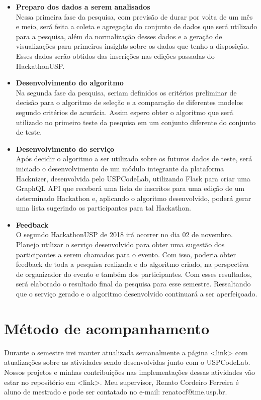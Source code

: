 \documentclass[10pt,twoside,a4paper]{article}
\begin{document}
  \begin{itemize}
    \item \textbf{Preparo dos dados a serem analisados} \\
        Nessa primeira fase da pesquisa, com previsão de durar por volta de um mês e meio, será feita a coleta e agregação do conjunto de dados que será utilizado para a pesquisa, além da normalização desses dados e a geração de visualizações para primeiros insights sobre os dados que tenho a disposição. Esses dados serão obtidos das inscrições nas edições passadas do HackathonUSP.
    
    \item \textbf{Desenvolvimento do algoritmo} \\
        Na segunda fase da pesquisa, seriam definidos os critérios preliminar de decisão para o algoritmo de seleção e a comparação de diferentes modelos segundo critérios de acurácia. Assim espero obter o algoritmo que será utilizado no primeiro teste da pesquisa em um conjunto diferente do conjunto de teste.
          
    \item \textbf{Desenvolvimento do serviço} \\
        Após decidir o algoritmo a ser utilizado sobre os futuros dados de teste, será iniciado o desenvolvimento de um módulo integrante da plataforma Hacknizer, desenvolvida pelo USPCodeLab, utilizando Flask para criar uma GraphQL API que receberá uma lista de inscritos para uma edição de um determinado Hackathon e, aplicando o algoritmo desenvolvido, poderá gerar uma lista sugerindo os participantes para tal Hackathon. 
    
    \item \textbf{Feedback} \\
        O segundo HackathonUSP de 2018 irá ocorrer no dia 02 de novembro. Planejo utilizar o serviço desenvolvido para obter uma sugestão dos participantes a serem chamados para o evento. Com isso, poderia obter feedback de toda a pesquisa realizada e do algoritmo criado, na perspectiva de organizador do evento e também dos participantes. Com esses resultados, será elaborado o resultado final da pesquisa para esse semestre. Ressaltando que o serviço gerado e o algoritmo desenvolvido continuará a ser aperfeiçoado.

  \end{itemize}

\section{Método de acompanhamento}

    Durante o semestre irei manter atualizada semanalmente a página <link> com atualizações sobre as atividades sendo desenvolvidas junto com o USPCodeLab. Nossos projetos e minhas contribuições nas implementações dessas atividades vão estar no repositório em <link>.
    Meu supervisor, Renato Cordeiro Ferreira é aluno de mestrado e pode ser contatado no e-mail: renatocf@ime.usp.br.
\end{document}
